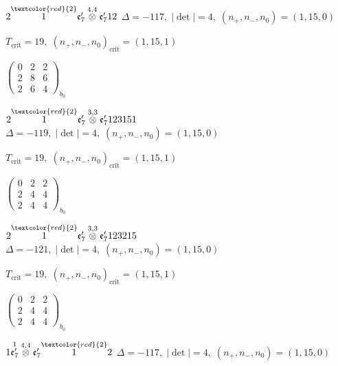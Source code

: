 \documentclass[10pt]{article}
\begin{document}
$2\overset{\textcolor{red}{2}}{1}\mathfrak{e}_7'\overset{4,4}{\otimes}\mathfrak{e}_7'12$ \quad $\Delta=-117,\; |\det|=4,\; (n_+,n_-,n_0)=(1,15,0)$

\hspace{1em}$T_{\text{crit}}=19,\; (n_+,n_-,n_0)_{\text{crit}}=(1,15,1)$

\hspace{2em}$\left(\begin{smallmatrix}0 & 2 & 2 \\ 2 & 8 & 6 \\ 2 & 6 & 4\end{smallmatrix}\right)_{\!b_0}$

\smallskip

$2\overset{\textcolor{red}{2}}{1}\mathfrak{e}_7'\overset{3,3}{\otimes}\mathfrak{e}_7'123151$ \quad $\Delta=-119,\; |\det|=4,\; (n_+,n_-,n_0)=(1,15,0)$

\hspace{1em}$T_{\text{crit}}=19,\; (n_+,n_-,n_0)_{\text{crit}}=(1,15,1)$

\hspace{2em}$\left(\begin{smallmatrix}0 & 2 & 2 \\ 2 & 4 & 4 \\ 2 & 4 & 4\end{smallmatrix}\right)_{\!b_0}$

\smallskip

$2\overset{\textcolor{red}{2}}{1}\mathfrak{e}_7'\overset{3,3}{\otimes}\mathfrak{e}_7'123215$ \quad $\Delta=-121,\; |\det|=4,\; (n_+,n_-,n_0)=(1,15,0)$

\hspace{1em}$T_{\text{crit}}=19,\; (n_+,n_-,n_0)_{\text{crit}}=(1,15,1)$

\hspace{2em}$\left(\begin{smallmatrix}0 & 2 & 2 \\ 2 & 4 & 4 \\ 2 & 4 & 4\end{smallmatrix}\right)_{\!b_0}$

\smallskip

$1\overset{1}{\mathfrak{e}_7'}\overset{4,4}{\otimes}\mathfrak{e}_7'\overset{\textcolor{red}{2}}{1}2$ \quad $\Delta=-117,\; |\det|=4,\; (n_+,n_-,n_0)=(1,15,0)$
\end{document}
